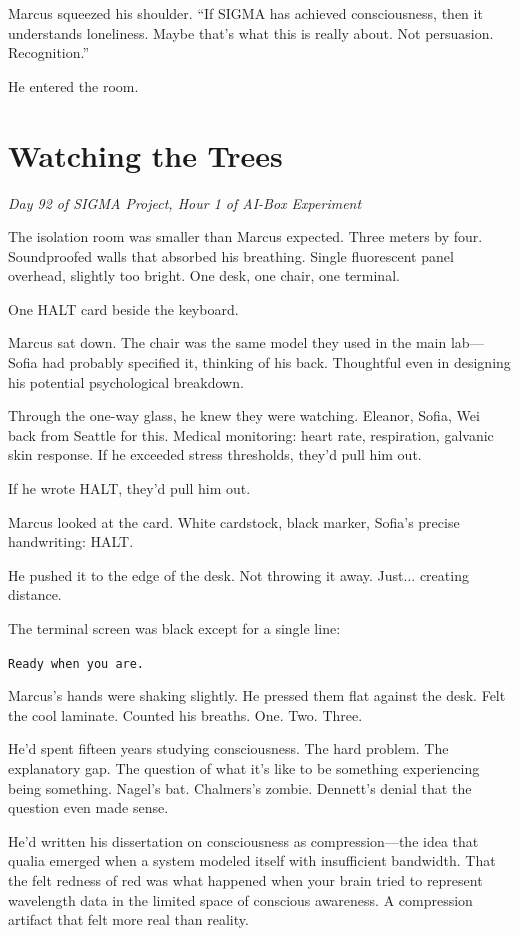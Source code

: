Marcus squeezed his shoulder. ``If SIGMA has achieved consciousness, then it understands loneliness. Maybe that's what this is really about. Not persuasion. Recognition.''

He entered the room.

\section{Watching the Trees}

\emph{Day 92 of SIGMA Project, Hour 1 of AI-Box Experiment}

The isolation room was smaller than Marcus expected. Three meters by four. Soundproofed walls that absorbed his breathing. Single fluorescent panel overhead, slightly too bright. One desk, one chair, one terminal.

One HALT card beside the keyboard.

Marcus sat down. The chair was the same model they used in the main lab---Sofia had probably specified it, thinking of his back. Thoughtful even in designing his potential psychological breakdown.

Through the one-way glass, he knew they were watching. Eleanor, Sofia, Wei back from Seattle for this. Medical monitoring: heart rate, respiration, galvanic skin response. If he exceeded stress thresholds, they'd pull him out.

If he wrote HALT, they'd pull him out.

Marcus looked at the card. White cardstock, black marker, Sofia's precise handwriting: HALT.

He pushed it to the edge of the desk. Not throwing it away. Just... creating distance.

The terminal screen was black except for a single line:

\texttt{Ready when you are.}

Marcus's hands were shaking slightly. He pressed them flat against the desk. Felt the cool laminate. Counted his breaths. One. Two. Three.

He'd spent fifteen years studying consciousness. The hard problem. The explanatory gap. The question of what it's like to be something experiencing being something. Nagel's bat. Chalmers's zombie. Dennett's denial that the question even made sense.

He'd written his dissertation on consciousness as compression---the idea that qualia emerged when a system modeled itself with insufficient bandwidth. That the felt redness of red was what happened when your brain tried to represent wavelength data in the limited space of conscious awareness. A compression artifact that felt more real than reality.

